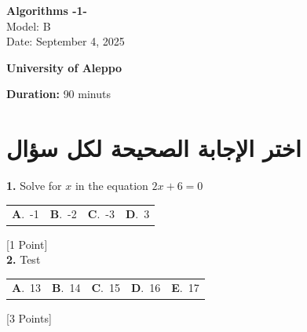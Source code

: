 \documentclass[12pt]{article}
\newcommand{\choice}[2]{\textbf{#1}.~#2}
\begin{document}
\begin{flushright}
{\Large \textbf{{\textenglish{Algorithms -1-}}}}\\[0.25em]
{\normalsize \textenglish{Model: }{\textenglish{B}}}\\[0.1em]
{\normalsize \textenglish{Date: }{\textenglish{September 4, 2025}}}
\end{flushright}

\vspace{0.6cm}

\noindent
\begin{minipage}[t]{0.65\textwidth}
  \raggedright
  \textbf{{\textenglish{University of Aleppo}}}\\[0.3em]
\end{minipage}\hfill
\begin{minipage}[t]{0.3\textwidth}
  \raggedleft
  \textenglish{\textbf{Duration: }}{\textenglish{90 minuts}}
\end{minipage}

\vspace{0.9cm}

\section*{اختر الإجابة الصحيحة لكل سؤال}

\noindent \textbf{\textenglish{1.}} {\textenglish{Solve for }}\(x \){\textenglish{ in the equation }}\(2x+6 = 0 \)

\begin{tabularx}{\linewidth}{@{}*{4}{Y}@{}}
\choice{A}{{{\textenglish{-1}}}} & \choice{B}{{{\textenglish{-2}}}} & \choice{C}{{{\textenglish{-3}}}} & \choice{D}{{{\textenglish{3}}}} \\
\end{tabularx}
\hfill {\textenglish{[1 Point]}}\\[0.5em]

\noindent \textbf{\textenglish{2.}} {\textenglish{Test}}

\begin{tabularx}{\linewidth}{@{}*{5}{Y}@{}}
\choice{A}{{{\textenglish{13}}}} & \choice{B}{{{\textenglish{14}}}} & \choice{C}{{{\textenglish{15}}}} & \choice{D}{{{\textenglish{16}}}} & \choice{E}{{{\textenglish{17}}}} \\
\end{tabularx}
\hfill {\textenglish{[3 Points]}}\\[0.5em]
\end{document}
